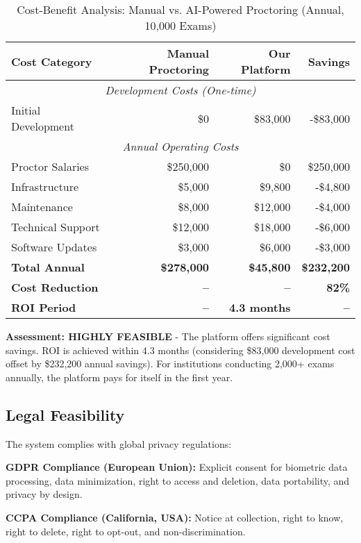 \begin{table}[ht]
\centering
\caption{Cost-Benefit Analysis: Manual vs. AI-Powered Proctoring (Annual, 10,000 Exams)}
\label{tab:cost_benefit}
\begin{tabular}{|l|r|r|r|}
\hline
\textbf{Cost Category} & \textbf{Manual Proctoring} & \textbf{Our Platform} & \textbf{Savings} \\
\hline
\multicolumn{4}{|c|}{\textit{Development Costs (One-time)}} \\
\hline
Initial Development & \$0 & \$83,000 & -\$83,000 \\
\hline
\multicolumn{4}{|c|}{\textit{Annual Operating Costs}} \\
\hline
Proctor Salaries & \$250,000 & \$0 & \$250,000 \\
Infrastructure & \$5,000 & \$9,800 & -\$4,800 \\
Maintenance & \$8,000 & \$12,000 & -\$4,000 \\
Technical Support & \$12,000 & \$18,000 & -\$6,000 \\
Software Updates & \$3,000 & \$6,000 & -\$3,000 \\
\hline
\textbf{Total Annual} & \textbf{\$278,000} & \textbf{\$45,800} & \textbf{\$232,200} \\
\hline
\textbf{Cost Reduction} & \textbf{--} & \textbf{--} & \textbf{82\%} \\
\hline
\textbf{ROI Period} & \textbf{--} & \textbf{4.3 months} & \textbf{--} \\
\hline
\end{tabular}
\end{table}

\textbf{Assessment: HIGHLY FEASIBLE} - The platform offers significant cost savings. ROI is achieved within 4.3 months (considering \$83,000 development cost offset by \$232,200 annual savings). For institutions conducting 2,000+ exams annually, the platform pays for itself in the first year.

\subsection{Legal Feasibility}

The system complies with global privacy regulations:

\textbf{GDPR Compliance (European Union):} Explicit consent for biometric data processing, data minimization, right to access and deletion, data portability, and privacy by design.

\textbf{CCPA Compliance (California, USA):} Notice at collection, right to know, right to delete, right to opt-out, and non-discrimination.


